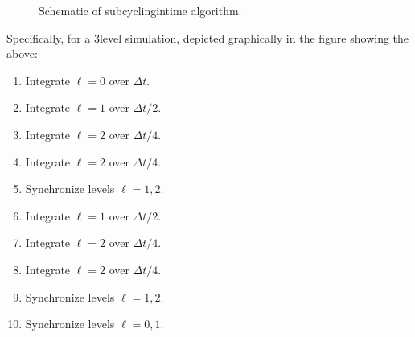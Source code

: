 \documentclass[letterpaper,10pt,english]{sphinxmanual}
\begin{document}
\begin{center}

\begin{figure}[htbp]
\centering
\capstart

\noindent{}
\caption{Schematic of subcycling\sphinxhyphen{}in\sphinxhyphen{}time algorithm.}\label{\detokenize{AmrCore:id3}}\label{\detokenize{AmrCore:fig-subcycling}}\end{figure}

\end{center}

\sphinxAtStartPar
Specifically, for a 3\sphinxhyphen{}level simulation, depicted graphically in the figure
showing the {\hyperref[\detokenize{AmrCore:fig-subcycling}]{}} above:
\begin{enumerate}
%
\item {} 
\sphinxAtStartPar
Integrate \(\ell=0\) over \(\Delta t\).

\item {} 
\sphinxAtStartPar
Integrate \(\ell=1\) over \(\Delta t/2\).

\item {} 
\sphinxAtStartPar
Integrate \(\ell=2\) over \(\Delta t/4\).

\item {} 
\sphinxAtStartPar
Integrate \(\ell=2\) over \(\Delta t/4\).

\item {} 
\sphinxAtStartPar
Synchronize levels \(\ell=1,2\).

\item {} 
\sphinxAtStartPar
Integrate \(\ell=1\) over \(\Delta t/2\).

\item {} 
\sphinxAtStartPar
Integrate \(\ell=2\) over \(\Delta t/4\).

\item {} 
\sphinxAtStartPar
Integrate \(\ell=2\) over \(\Delta t/4\).

\item {} 
\sphinxAtStartPar
Synchronize levels \(\ell=1,2\).

\item {} 
\sphinxAtStartPar
Synchronize levels \(\ell=0,1\).

\end{enumerate}
\end{document}
